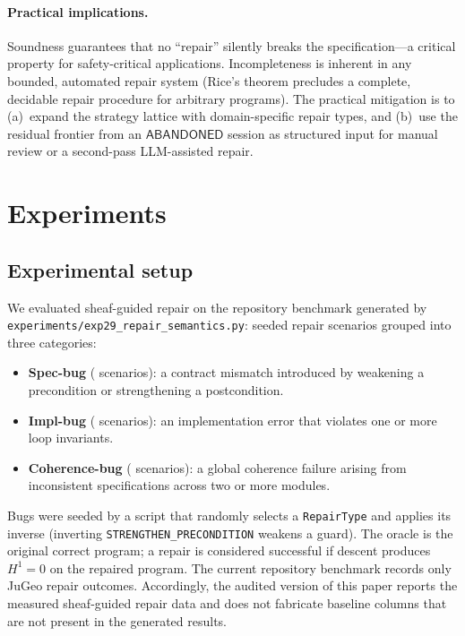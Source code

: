 \documentclass[11pt]{article}
\begin{document}
\paragraph{Practical implications.}
Soundness guarantees that no ``repair'' silently breaks the specification---a
critical property for safety-critical applications.  Incompleteness is
inherent in any bounded, automated repair system (Rice's theorem precludes
a complete, decidable repair procedure for arbitrary programs).  The
practical mitigation is to (a)~expand the strategy lattice with
domain-specific repair types, and (b)~use the residual frontier from an
$\mathsf{ABANDONED}$ session as structured input for manual review or a
second-pass LLM-assisted repair.

\section{Experiments}
\label{sec:experiments}

\subsection{Experimental setup}

We evaluated sheaf-guided repair on the repository benchmark generated by
\texttt{experiments/exp29\_repair\_semantics.py}: \ppTwentynineRepairTotal{}
seeded repair scenarios grouped into three categories:
\begin{itemize}
  \item \textbf{Spec-bug} (\ppTwentynineSpecCount{} scenarios): a contract
        mismatch introduced by weakening a precondition or strengthening a
        postcondition.
  \item \textbf{Impl-bug} (\ppTwentynineImplCount{} scenarios): an
        implementation error that violates one or more loop invariants.
  \item \textbf{Coherence-bug} (\ppTwentynineCoherenceCount{} scenarios): a
        global coherence failure arising from inconsistent specifications
        across two or more modules.
\end{itemize}
Bugs were seeded by a script that randomly selects a \texttt{RepairType} and
applies its inverse (\eg inverting \texttt{STRENGTHEN\_PRECONDITION} weakens
a guard).  The oracle is the original correct program; a repair is considered
successful if descent produces $H^1 = 0$ on the repaired program.
The current repository benchmark records only JuGeo repair outcomes.
Accordingly, the audited version of this paper reports the measured
sheaf-guided repair data and does not fabricate baseline columns that are not
present in the generated results.
\end{document}
